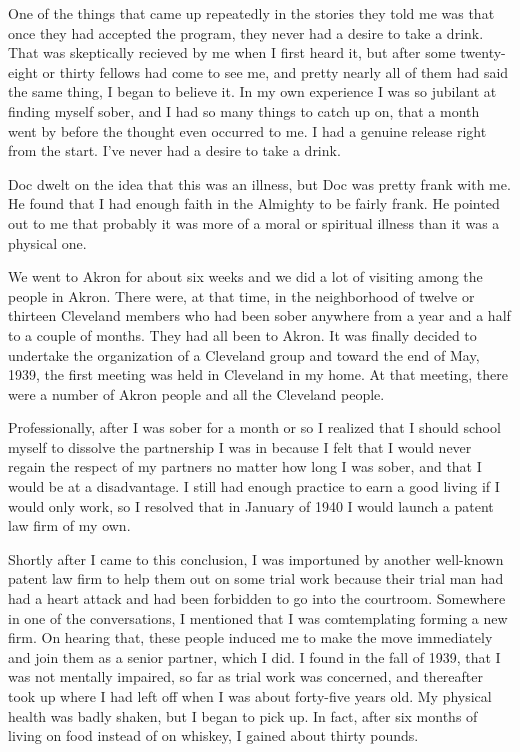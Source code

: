 \begin{biblechapter}
One of the things that came up repeatedly in the stories they told me was that once they had accepted the program, they never had a desire to take a drink. That was skeptically recieved by me when I first heard it, but after some twenty-eight or thirty fellows had come to see me, and pretty nearly all of them had said the same thing, I began to believe it. In my own experience I was so jubilant at finding myself sober, and I had so many things to catch up on, that a month went by before the thought even occurred to me. I had a genuine release right from the start. I’ve never had a desire to take a drink.

Doc dwelt on the idea that this was an illness, but Doc was pretty frank with me. He found that I had enough faith in the Almighty to be fairly frank. He pointed out to me that probably it was more of a moral or spiritual illness than it was a physical one.

We went to Akron for about six weeks and we did a lot of visiting among the people in Akron. There were, at that time, in the neighborhood of twelve or thirteen Cleveland members who had been sober anywhere from a year and a half to a couple of months. They had all been to Akron. It was finally decided to undertake the organization of a Cleveland group and toward the end of May, 1939, the first meeting was held in Cleveland in my home. At that meeting, there were a number of Akron people and all the Cleveland people.

Professionally, after I was sober for a month or so I realized that I should school myself to dissolve the partnership I was in because I felt that I would never regain the respect of my partners no matter how long I was sober, and that I would be at a disadvantage. I still had enough practice to earn a good living if I would only work, so I resolved that in January of 1940 I would launch a patent law firm of my own.

Shortly after I came to this conclusion, I was importuned by another well-known patent law firm to help them out on some trial work because their trial man had had a heart attack and had been forbidden to go into the courtroom. Somewhere in one of the conversations, I mentioned that I was comtemplating forming a new firm. On hearing that, these people induced me to make the move immediately and join them as a senior partner, which I did. I found in the fall of 1939, that I was not mentally impaired, so far as trial work was concerned, and thereafter took up where I had left off when I was about forty-five years old. My physical health was badly shaken, but I began to pick up. In fact, after six months of living on food instead of on whiskey, I gained about thirty pounds.


\end{biblechapter}
